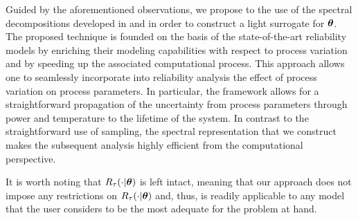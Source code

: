 Guided by the aforementioned observations, we propose to the use of the spectral decompositions developed in  and  in order to construct a light surrogate for $\bm{\theta}$.
The proposed technique is founded on the basis of the state-of-the-art reliability models by enriching their modeling capabilities with respect to process variation and by speeding up the associated computational process.
This approach allows one to seamlessly incorporate into reliability analysis the effect of process variation on process parameters.
In particular, the framework allows for a straightforward propagation of the uncertainty from process parameters through power and temperature to the lifetime of the system.
In contrast to the straightforward use of  sampling, the spectral representation that we construct makes the subsequent analysis highly efficient from the computational perspective.

It is worth noting that $R_\tau(\cdot | \bm{\theta})$ is left intact, meaning that our approach does not impose any restrictions on $R_\tau(\cdot | \bm{\theta})$ and, thus, is readily applicable to any model that the user considers to be the most adequate for the problem at hand.

